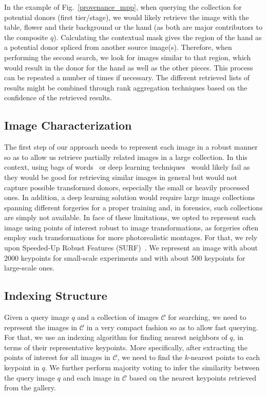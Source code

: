 In the example of Fig.~\ref{provenance_mpp}, when querying the collection for potential donors (first tier/stage), we would likely retrieve the image with the table, flower and their background or the hand (as both are major contributors to the composite $q$). Calculating the contextual mask gives the region of the hand as a potential donor spliced from another source image(s). Therefore, when performing the second search, we look for images similar to that region, which would result in the donor for the hand as well as the other pieces. This process can be repeated a number of times if necessary. The different retrieved lists of results might be combined through rank aggregation techniques based on the confidence of the retrieved results. 

\subsection{Image Characterization}

The first step of our approach needs to represent each image in a robust manner so as to allow us retrieve partially related images in a large collection. In this context, using bags of words~\cite{Datta_2008} or deep learning techniques~\cite{Goodfellow_2016} would likely fail as they would be good for retrieving similar images in general but would not capture possible transformed donors, especially the small or heavily processed ones. In addition, a deep learning solution would require large image collections spanning different forgeries for a proper training and, in forensics, such collections are simply not available. In face of these limitations, we opted to represent each image using points of interest robust to image transformations, as forgeries often employ such transformations for more photorealistic montages. For that, we rely upon Speeded-Up Robust Features (SURF)~\cite{Bay:CVIU:2008}. We represent an image with about 2000 keypoints for small-scale experiments and with about 500 keypoints for large-scale ones. 

\subsection{Indexing Structure}
Given a query image $q$ and a collection of images $\mathcal{C}$ for searching, we need to represent the images in $\mathcal{C}$ in a very compact fashion so as to allow fast querying. For that, we use an indexing algorithm for finding nearest neighbors of $q$, in terms of their representative keypoints. More specifically, after extracting the points of interest for all images in $\mathcal{C}$, we need to find the $k$-nearest points to each keypoint in $q$. We further perform majority voting to infer the similarity between the query image $q$ and each image in $\mathcal{C}$ based on the nearest keypoints retrieved from the gallery.

